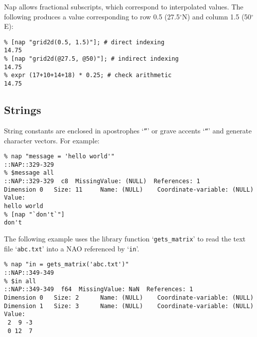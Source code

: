   

Nap allows fractional subscripts, which correspond to interpolated
  values. The following produces a value corresponding to row 0.5
  (27.5$^{\circ}$N) and column 1.5 (50$^{\circ}$E):
  \begin{verbatim}
% [nap "grid2d(0.5, 1.5)"]; # direct indexing
14.75
% [nap "grid2d(@27.5, @50)"]; # indirect indexing
14.75
% expr (17+10+14+18) * 0.25; # check arithmetic
14.75
\end{verbatim}

\subsection{Strings}
    \label{array-Strings}

String constants are enclosed in apostrophes `\texttt{''}' or grave accents `\texttt{``}' and generate character vectors. For example:
  \begin{verbatim}
% nap "message = 'hello world'"
::NAP::329-329
% $message all
::NAP::329-329  c8  MissingValue: (NULL)  References: 1
Dimension 0   Size: 11     Name: (NULL)    Coordinate-variable: (NULL)
Value:
hello world
% [nap "`don't`"]
don't
\end{verbatim}

  

The following example uses the library function `\texttt{gets\_matrix}' to
    read the text file `\texttt{abc.txt}' into a NAO referenced
    by `\texttt{in}'.
  \begin{verbatim}
% nap "in = gets_matrix('abc.txt')"
::NAP::349-349
% $in all
::NAP::349-349  f64  MissingValue: NaN  References: 1
Dimension 0   Size: 2      Name: (NULL)    Coordinate-variable: (NULL)
Dimension 1   Size: 3      Name: (NULL)    Coordinate-variable: (NULL)
Value:
 2  9 -3
 0 12  7
\end{verbatim}

